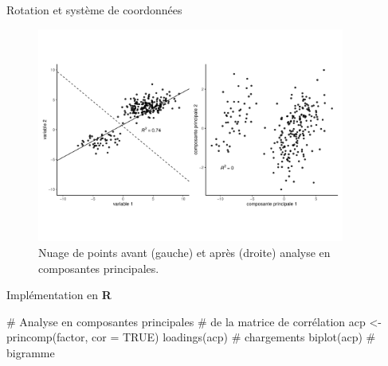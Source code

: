 \documentclass[
  ignorenonframetext,
]{beamer}
\newenvironment{Shaded}{\begin{snugshade}}{\end{snugshade}}
\newcommand{\AttributeTok}[1]{\textcolor[rgb]{0.40,0.45,0.13}{#1}}
\newcommand{\CommentTok}[1]{\textcolor[rgb]{0.37,0.37,0.37}{#1}}
\newcommand{\ConstantTok}[1]{\textcolor[rgb]{0.56,0.35,0.01}{#1}}
\newcommand{\FunctionTok}[1]{\textcolor[rgb]{0.28,0.35,0.67}{#1}}
\newcommand{\NormalTok}[1]{\textcolor[rgb]{0.00,0.23,0.31}{#1}}
\newcommand{\OtherTok}[1]{\textcolor[rgb]{0.00,0.23,0.31}{#1}}
\begin{document}
\begin{frame}{Rotation et système de coordonnées}
\protect\hypertarget{rotation-et-systuxe8me-de-coordonnuxe9es}{}
\begin{figure}

{\centering \includegraphics[width=0.9\textwidth,height=\textheight]{MATH60602-diapos3_files/figure-beamer/fig-acprotation-1.pdf}

}

\caption{\label{fig-acprotation}Nuage de points avant (gauche) et après
(droite) analyse en composantes principales.}

\end{figure}
\end{frame}

\begin{frame}[fragile]{Implémentation en \textbf{R}}
\protect\hypertarget{impluxe9mentation-en-r}{}
\begin{Shaded}
\begin{Highlighting}[]
\CommentTok{\# Analyse en composantes principales}
\CommentTok{\# de la matrice de corrélation}
\NormalTok{acp }\OtherTok{\textless{}{-}} \FunctionTok{princomp}\NormalTok{(factor, }\AttributeTok{cor =} \ConstantTok{TRUE}\NormalTok{)}
\FunctionTok{loadings}\NormalTok{(acp) }\CommentTok{\# chargements}
\FunctionTok{biplot}\NormalTok{(acp) }\CommentTok{\# bigramme}
\end{Highlighting}
\end{Shaded}
\end{frame}
\end{document}
